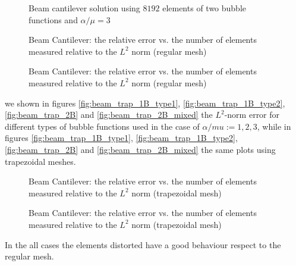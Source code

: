 \documentclass[preprint,12pt,authoryear]{elsarticle}
\begin{document}
\begin{figure}[!h]
\begin{center}
\caption{Beam cantilever solution using $8192$ elements of two bubble functions and $\alpha/ \mu=3$}
\end{center}
\end{figure}
%
\begin{figure}[h!]
\begin{center}
\caption{Beam Cantilever: the relative error vs. the number of elements measured relative to the $L^{2}$ norm (regular mesh)}
\end{center}
\end{figure}
%
\begin{figure}[h!]
\begin{center}
\caption{Beam Cantilever: the relative error vs. the number of elements measured relative to the $L^{2}$ norm (regular mesh)} 
\end{center}
\end{figure}
we shown in figures \ref{fig:beam_trap_1B_type1}, \ref{fig:beam_trap_1B_type2}, \ref{fig:beam_trap_2B} and \ref{fig:beam_trap_2B_mixed} the $L^{2}$-norm error for different types of bubble functions used in the case of $\alpha/mu:={1,2,3}$, while in figures \ref{fig:beam_trap_1B_type1}, \ref{fig:beam_trap_1B_type2}, \ref{fig:beam_trap_2B} and \ref{fig:beam_trap_2B_mixed} the same plots using trapezoidal meshes.
\begin{figure}[h!]
\begin{center}
\caption{Beam Cantilever: the relative error vs. the number of elements measured relative to the $L^{2}$ norm (trapezoidal mesh)}
\end{center}
\end{figure}
%
\begin{figure}[h!]
\begin{center}
\caption{Beam Cantilever: the relative error vs. the number of elements measured relative to the $L^{2}$ norm (trapezoidal mesh)}
\end{center}
\end{figure}
In the all cases the elements distorted have a good behaviour respect to the regular mesh.  
\end{document}
